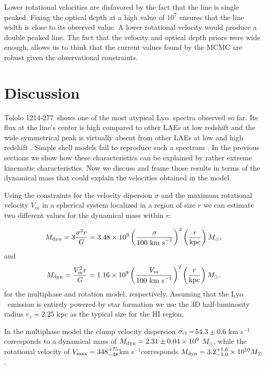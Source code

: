 \documentclass[a4,useAMS,usenatbib,usegraphicx]{mn2e}
\newcommand{\tol}{Tololo 1214-277}
\newcommand{\lya}{Ly$\alpha$}
\newcommand{\kms}{km s$^{-1}$}
\newcommand{\sigmaclump}{$54.3\pm 0.6$ km s$^{-1}$}
\begin{document}
Lower rotational velocities are disfavored by the fact that the line
is single peaked.
Fixing the optical depth at a high value of $10^7$ ensures that the line width
is close to its observed value.
A lower rotational velocity would produce a double peaked line.
The fact that the velocity and optical depth priors were wide enough,
allows us to think that the current values found by the MCMC are
robust given the observational constraints.




\section{Discussion}

\tol\ shows one of the most atypical \lya\ spectra observed so far.
Its flux at the line's center is high compared to other LAEs at low
redshift and the wide symmetrical peak is virtually absent from other
LAEs at low and high redshift \citep{LARS,Erb14,Trainor16}. Simple
shell models fail to reproduce such a spectrum
\cite{2015A&A...578A...7V}.  
In the previous sections we show how these characteristics can be
explained by rather extreme kinematic characteristics.
Now we discuss and frame those results in terms of the dynamical mass
that could explain the velocities obtained in the model.

Using the constraints for the velocity dipersion $\sigma$ and the
maximum rotational velocity $V_m$ in a spherical system localized in a
region of size $r$ we can estimate two different values for the
dynamical mass within $r$: 

\begin{equation}
M_{\rm dyn} = 3 \frac{\sigma ^{2}r}{G} = 3.48\times10^{9}
\left(\frac{\sigma}{100\ \mathrm{km\ s}^{-1}}\right)^2\left(\frac{r}{\mathrm{kpc}}\right)
M_{\odot}, 
\end{equation}
%
and
%
\begin{equation}
M_{\rm dyn} = \frac{V_m ^{2}r}{G} = 1.16\times10^{9}
\left(\frac{V_m}{100\ \mathrm{km\ s}^{-1}}\right)^2\left(\frac{r}{\mathrm{kpc}}\right)M_{\odot}, 
\end{equation}
%
for the multiphase and rotation model, respectively.
Assuming that the \lya\ emission is entirely powered by star formation 
we use the 3D half-luminosity radius $r_s=2.25$ kpc as the typical size
for the HI region,


In the multiphase model the clump velocity dispersion
$\sigma_{\rm{cl}}=$\sigmaclump corresponds to a dynamical mass of
$M_{\rm dyn}=2.31\pm0.04 \times 10^{9}$ $M_{\odot}$, while the
rotational velocity of $V_{\rm max}=348^{+75}_{-48}$\kms corresponds
$M_{\rm dyn} = 3.2_{-1.0}^{+1.6}\times 10^{10} M_{\odot}$.
\end{document}
